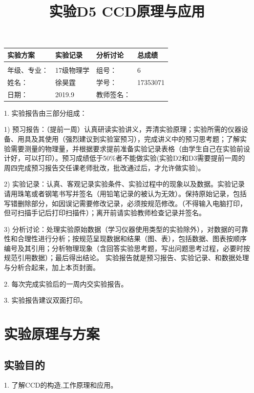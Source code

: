 \documentclass{ctexart}
\title{实验D5 CCD原理与应用}
\begin{document}
\maketitle

\begin{tabular}{|p{8em}|p{8em}|p{8em}|p{5em}|}
\hline
		\large{实验方案} &\large{实验记录}  &\large{分析讨论} &\large{总成绩}\\
		\hline
		        &          &          &  \\
	    \hline
	\hline 
	年级、专业： &17级物理学 &组号：& 6 \\
	\hline
	姓名：& 徐昊霆 &学号：&17353071  \\
	\hline
	日期：& 2019.9 &教师签名： &  \\
    \hline	
        \end{tabular}
        
        1. 实验报告由三部分组成：
        
        1) 预习报告：（提前一周）认真研读实验讲义，弄清实验原理；实验所需的仪器设备、用具及其使用（强烈建议到实验室预习），完成讲义中的预习思考题；了解实验需要测量的物理量，并根据要求提前准备实验记录表格（由学生自己在实验前设计好，可以打印）。预习成绩低于50\%者不能做实验(实验D2和D3需要提前一周的周四完成预习报告交任课老师批改，批改通过后，才允许做实验)。
        
        2) 实验记录：认真、客观记录实验条件、实验过程中的现象以及数据。实验记录请用珠笔或者钢笔书写并签名（用铅笔记录的被认为无效）。保持原始记录，包括写错删除部分，如因误记需要修改记录，必须按规范修改。（不得输入电脑打印，但可扫描手记后打印扫描件）；离开前请实验教师检查记录并签名。
        
    3) 分析讨论：处理实验原始数据（学习仪器使用类型的实验除外），对数据的可靠性和合理性进行分析；按规范呈现数据和结果（图、表），包括数据、图表按顺序编号及其引用；分析物理现象（含回答实验思考题，写出问题思考过程，必要时按规范引用数据）；最后得出结论。
    实验报告就是预习报告、实验记录、和数据处理与分析合起来，加上本页封面。
    
    2. 每次完成实验后的一周内交实验报告。
    
    3. 实验报告建议双面打印。
\newpage
\tableofcontents
\newpage
\section{实验原理与方案}
\subsection{实验目的}
1. 了解CCD的构造,工作原理和应用。
\end{document}
